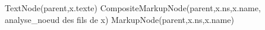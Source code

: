 \begin{algorithm}[H]
\caption{}
\begin{algorithmic}
       \RETURN TextNode(parent,x.texte)
   \ELSE
       \RETURN CompositeMarkupNode(parent,x.ns,x.name, analyse_noeud des fils de x)
   \ELSE
       \RETURN MarkupNode(parent,x.ns,x.name)
   \ENDIF
\END

\end{algorithmic}
\end{algorithm}


